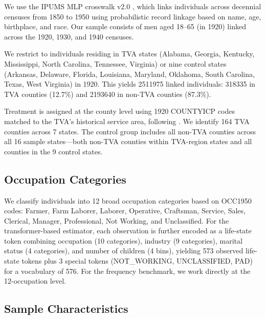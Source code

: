 \documentclass[12pt]{article}
\begin{document}
We use the IPUMS MLP crosswalk v2.0 \citep{abramitzky2021}, which links individuals across decennial censuses from 1850 to 1950 using probabilistic record linkage based on name, age, birthplace, and race. Our sample consists of men aged 18--65 (in 1920) linked across the 1920, 1930, and 1940 censuses.

We restrict to individuals residing in TVA states (Alabama, Georgia, Kentucky, Mississippi, North Carolina, Tennessee, Virginia) or nine control states (Arkansas, Delaware, Florida, Louisiana, Maryland, Oklahoma, South Carolina, Texas, West Virginia) in 1920. This yields \num{2511975} linked individuals: \num{318335} in TVA counties (12.7\%) and \num{2193640} in non-TVA counties (87.3\%).

Treatment is assigned at the county level using 1920 COUNTYICP codes matched to the TVA's historical service area, following \citet{kline2014}. We identify 164 TVA counties across 7 states. The control group includes all non-TVA counties across all 16 sample states---both non-TVA counties within TVA-region states and all counties in the 9 control states.

\subsection{Occupation Categories}

We classify individuals into 12 broad occupation categories based on OCC1950 codes: Farmer, Farm Laborer, Laborer, Operative, Craftsman, Service, Sales, Clerical, Manager, Professional, Not Working, and Unclassified. For the transformer-based estimator, each observation is further encoded as a life-state token combining occupation (10 categories), industry (9 categories), marital status (4 categories), and number of children (4 bins), yielding 573 observed life-state tokens plus 3 special tokens (NOT\_WORKING, UNCLASSIFIED, PAD) for a vocabulary of 576. For the frequency benchmark, we work directly at the 12-occupation level.

\subsection{Sample Characteristics}
\end{document}
